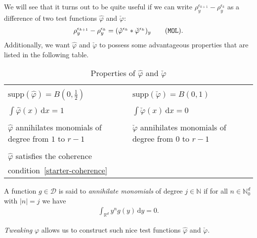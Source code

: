We will see that it turns out to be quite useful if we can write \(\rho_y^{\epsilon_{k+1}} - \rho_y^{\epsilon_k}\) as a difference of two test functions \(\hat \varphi\) and \(\check \varphi\):
\begin{align*}\label{rho-dif}
    \rho_y^{\epsilon_{k+1}} - \rho_y^{\epsilon_k} = (\hat \varphi^{\epsilon_k} * \check \varphi^{\epsilon_k} )_y \tag{\texttt{MOL}}.
\end{align*}
Additionally, we want \(\hat \varphi\) and \(\check \varphi\) to possess some advantageous properties that are listed in the following table.

\begin{table}[H]
\centering
\begin{tabular}{p{50mm}|p{50mm}} %
    \bottomrule
    \\[-0.5em]
    \(\mathrm{supp}(\hat \varphi) = B(0,\frac{1}{2})\) &  \(\mathrm{supp}(\check \varphi) = B(0,1)\)\\
    \\[-0.5em]
    \(\int \hat \varphi(x) \, \mathrm{d}x = 1\)&  \(\int \check \varphi(x) \, \mathrm{d}x = 0\)\\
    \\[-0.5em]
    \(\hat \varphi\) annihilates monomials \newline of degree from \(1\) to \(r-1\) & \(\check \varphi \) annihilates monomials  \newline of degree from \(0\) to \(r-1\)\\
    \\[-0.5em]
    \(\hat \varphi\) satisfies the coherence \\condition~\eqref{starter-coherence}& \\[0.5em]
    \toprule
\end{tabular}
\caption{Properties of \(\hat \varphi\) and \(\check \varphi\)}\label{table:properties-tweak}
\end{table}

\begin{definition}
    A function \(g \in \mathcal{D}\) is said to \emph{annihilate monomials} of degree \(j \in \mathbb{N}\) if for all \(n \in \mathbb{N}^d_0\) with \(|n| = j\) we have
    \begin{align*}
        \int_{\mathbb{R}^d} y^n g (y) \, \mathrm{d}y = 0.
    \end{align*}
\end{definition}

\emph{Tweaking} \(\varphi\) allows us to construct such nice test functions \(\hat \varphi\) and \(\check \varphi\).

